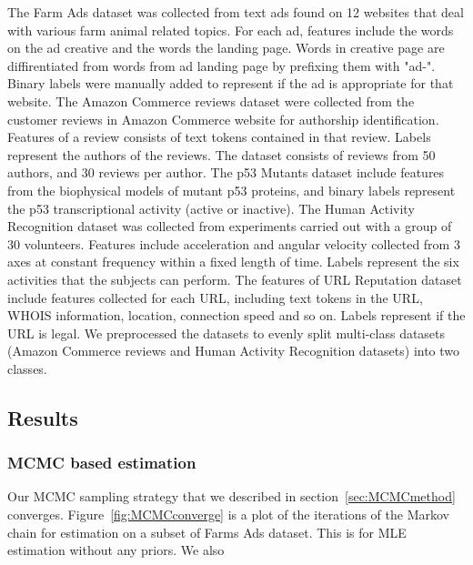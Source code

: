 The Farm Ads dataset was collected from text ads found on 12 websites that deal with various farm animal related topics. For each ad, features include the words on the ad creative and the words the landing page. Words in creative page are diffirentiated from words from ad landing page by prefixing them with "ad-". Binary labels were manually added to represent if the ad is appropriate for that website. The Amazon Commerce reviews dataset were collected from the customer reviews in Amazon Commerce website for authorship identification. Features of a review consists of text tokens contained in that review. Labels represent the authors of the reviews. The dataset consists of reviews from 50 authors, and 30 reviews per author. The p53 Mutants dataset include features from the biophysical models of mutant p53 proteins, and binary labels represent the p53 transcriptional activity (active or inactive). The Human Activity Recognition dataset was collected from experiments carried out with a group of 30 volunteers. Features include acceleration and angular velocity collected from 3 axes at constant frequency within a fixed length of time. Labels represent the six activities that the subjects can perform. The features of URL Reputation dataset include features collected for each URL, including text tokens in the URL, WHOIS information, location, connection speed and so on. Labels represent if the URL is legal. We preprocessed the datasets to evenly split multi-class datasets (Amazon Commerce reviews and Human Activity Recognition datasets) into two classes.




\subsection{Results}

\subsubsection{MCMC based estimation}
Our MCMC sampling strategy that we described in section~\ref{sec:MCMCmethod}
converges. Figure~\ref{fig:MCMCconverge} is a plot of the iterations of the Markov 
chain for estimation on a subset of Farms Ads dataset. This is for MLE
estimation without any priors. We also 

